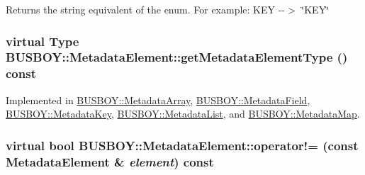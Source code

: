 Returns the string equivalent of the enum. For example: KEY -\/-\/$>$ \char`\"{}KEY\char`\"{} \hypertarget{classBUSBOY_1_1MetadataElement_a048a64f1d70affc5bfdd78a9958c5fb9}{
\subsubsection[{getMetadataElementType}]{\setlength{\rightskip}{0pt plus 5cm}virtual {\bf Type} BUSBOY::MetadataElement::getMetadataElementType () const}}
\label{classBUSBOY_1_1MetadataElement_a048a64f1d70affc5bfdd78a9958c5fb9}


Implemented in \hyperlink{classBUSBOY_1_1MetadataArray_af8706944f1dd70088aca6edfa0b9b4dd}{BUSBOY::MetadataArray}, \hyperlink{classBUSBOY_1_1MetadataField_abfa4376d1d8cec6e7c0cef293276a33a}{BUSBOY::MetadataField}, \hyperlink{classBUSBOY_1_1MetadataKey_a1e61e743e965046f08839d820f2d8320}{BUSBOY::MetadataKey}, \hyperlink{classBUSBOY_1_1MetadataList_a3181a951dff0539250ce1465a2b6cf3a}{BUSBOY::MetadataList}, and \hyperlink{classBUSBOY_1_1MetadataMap_af64fb7f0f22996956ec2adb09892dcb5}{BUSBOY::MetadataMap}.\hypertarget{classBUSBOY_1_1MetadataElement_a9895dfd3f251e26e8d818871405ce4c7}{
\subsubsection[{operator!=}]{\setlength{\rightskip}{0pt plus 5cm}virtual bool BUSBOY::MetadataElement::operator!= (const {\bf MetadataElement} \& {\em element}) const}}
\label{classBUSBOY_1_1MetadataElement_a9895dfd3f251e26e8d818871405ce4c7}



